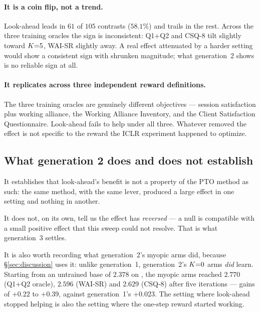 \paragraph{It is a coin flip, not a trend.}
Look-ahead leads in $61$ of $105$ contrasts ($58.1\%$) and trails in the rest. Across the three
training oracles the sign is inconsistent: Q1{+}Q2 and CSQ-8 tilt slightly toward $K{=}5$,
WAI-SR slightly away. A real effect attenuated by a harder setting would show a consistent sign
with shrunken magnitude; what generation~2 shows is no reliable sign at all.

\paragraph{It replicates across three independent reward definitions.}
The three training oracles are genuinely different objectives --- session satisfaction plus
working alliance, the Working Alliance Inventory, and the Client Satisfaction Questionnaire.
Look-ahead fails to help under all three. Whatever removed the effect is not specific to the
reward the ICLR experiment happened to optimize.

\subsection{What generation 2 does and does not establish}
It establishes that look-ahead's benefit is not a property of the PTO method as such: the same
method, with the same lever, produced a large effect in one setting and nothing in another.

It does not, on its own, tell us the effect has \emph{reversed} --- a null is compatible with a
small positive effect that this sweep could not resolve. That is what generation~3 settles.

It is also worth recording what generation~2's myopic arms did, because \S\ref{sec:discussion}
uses it: unlike generation~1, generation~2's $K{=}0$ arms \emph{did} learn. Starting from an
untrained base of $2.378$ on \QQ{}, the myopic arms reached $2.770$ (Q1{+}Q2 oracle), $2.596$
(WAI-SR) and $2.629$ (CSQ-8) after five iterations --- gains of $+0.22$ to $+0.39$, against
generation~1's $+0.023$. The setting where look-ahead stopped helping is also the setting where
the one-step reward started working.
